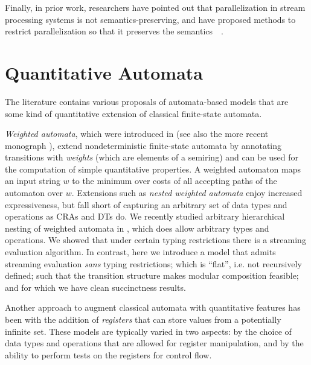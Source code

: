Finally, in prior work,
researchers have pointed out that
parallelization in stream processing systems is not
semantics-preserving, and have proposed methods to restrict
parallelization so that it preserves the
semantics~\cite{schneider2013safe}~.


\section{Quantitative Automata}

The literature contains various proposals of automata-based models that are some kind of quantitative extension of classical finite-state automata.

\emph{Weighted automata}, which were introduced in \cite{S1961WA} (see also the more recent monograph \cite{DKV2009HWA}), extend nondeterministic finite-state automata by annotating transitions with \emph{weights} (which are elements of a semiring) and can be used for the computation of simple quantitative properties. A weighted automaton maps an input string $w$ to the minimum over costs of all accepting paths of the automaton over $w$.
Extensions such as \emph{nested weighted automata} \cite{CHO2015NWA} enjoy increased expressiveness, but fall short of capturing an arbitrary set of data types and operations as CRAs and DTs do. We recently studied arbitrary hierarchical nesting of weighted automata in \cite{AMS2017SA}, which does allow arbitrary types and operations. We showed that under certain typing restrictions there is a streaming evaluation algorithm. In contrast, here we introduce a model that admits streaming evaluation \emph{sans} typing restrictions; which is ``flat'', i.e. not recursively defined; such that the transition structure makes modular composition feasible; and for which we have clean succinctness results.

Another approach to augment classical automata with quantitative features has been with the addition of \emph{registers} that can store values from a potentially infinite set. These models are typically varied in two aspects: by the choice of data types and operations that are allowed for register manipulation, and by the ability to perform tests on the registers for control flow.

